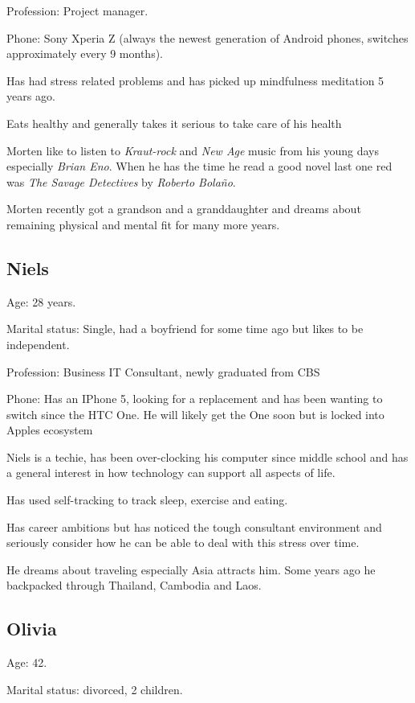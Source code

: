 \documentclass[a4paper,10pt,english,lof,lot,twoside]{puthesis}
\begin{document}
Profession: Project manager.

Phone: Sony Xperia Z (always the newest generation of Android phones, switches approximately every 9 months).

Has had stress related problems and has picked up mindfulness
meditation 5 years ago.

Eats healthy and generally takes it serious to take care of his health

Morten like to listen to \emph{Kraut-rock} and \emph{New Age} music from his
young days especially \emph{Brian Eno}. When he has the time he read a good
novel last one red was \emph{The Savage Detectives} by \emph{Roberto Bolaño}.

Morten recently got a grandson and a granddaughter and dreams about
remaining physical and mental fit for many more years.


\subsection{Niels}
\label{appendix_design_personas:niels}
Age: 28 years.

Marital status: Single, had a boyfriend for some time ago but likes to be
independent.

Profession: Business IT Consultant, newly graduated from CBS

Phone: Has an IPhone 5, looking for a replacement and has been
wanting to switch since the HTC One. He will likely get the One soon
but is locked into Apples ecosystem

Niels is a techie, has been over-clocking his computer since middle
school and has a general interest in how technology can support all
aspects of life.

Has used self-tracking to track sleep, exercise and eating.

Has career ambitions but has noticed the tough consultant environment
and seriously consider how he can be able to deal with this stress
over time.

He dreams about traveling especially Asia attracts him. Some years ago
he backpacked through Thailand, Cambodia and Laos.


\subsection{Olivia}
\label{appendix_design_personas:olivia}
Age: 42.

Marital status: divorced, 2 children.
\end{document}
